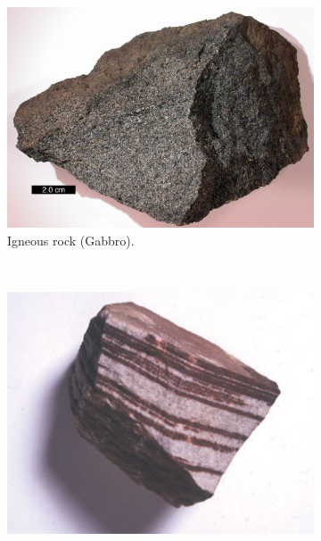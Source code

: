 \documentclass[a4paper,12pt]{report}
\begin{document}
\begin{figure}[]
        \centering
        \begin{subfigure}[b]{0.3\textwidth}
                \centering
                \includegraphics[width=\textwidth]{thesis/geo/gabbro.jpg}
                \caption{Igneous rock (Gabbro).}
                \label{fig:gull}
        \end{subfigure}%
        ~ %
        \begin{subfigure}[b]{0.3\textwidth}
                \centering
                \includegraphics[width=\textwidth]{thesis/geo/sandstone.jpg}

\end{subfigure}
\end{figure}
\end{document}
